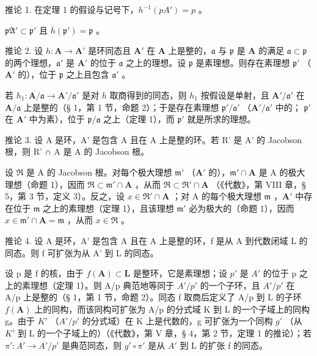 推论 1. 在定理 1 的假设与记号下，\(h^{-1}(pA') = p\) 。

\(\mathfrak{pA}' \subset \mathfrak{p}'\) 且 \(\overline{h}(\mathfrak{p}') = \mathfrak{p}\) 。

推论 2. 设 \(h: \mathbf{A} \to \mathbf{A}'\) 是环同态且 \(\mathbf{A}'\) 在 \(\mathbf{A}\) 上是整的，\(\mathfrak{a}\) 与 \(\mathfrak{p}\) 是 \(\mathbf{A}\) 的满足 \(\mathfrak{a} \subset \mathfrak{p}\) 的两个理想，\(\mathfrak{a}'\) 是 \(\mathbf{A}'\) 的位于 \(\mathfrak{a}\) 之上的理想。设 \(\mathfrak{p}\) 是素理想。则存在素理想 \(\mathfrak{p}'\) （\(\mathbf{A}'\) 的），位于 \(\mathfrak{p}\) 之上且包含 \(\mathfrak{a}'\) 。

若 \(h_1 \colon \mathbf{A} / \mathfrak{a} \to \mathbf{A}' / \mathfrak{a}'\) 是对 \(h\) 取商得到的同态，则 \(h_1\) 按假设是单射，且 \(\mathbf{A}' / \mathfrak{a}'\) 在 \(\mathbf{A} / \mathfrak{a}\) 上是整的（§ 1，第 1 节，命题 2）；于是存在素理想 \(\mathfrak{p}' / \mathfrak{a}'\) （\(\mathbf{A}' / \mathfrak{a}'\) 中的； \(\mathfrak{p}'\) 在 \(\mathbf{A}'\) 中为素），位于 \(\mathfrak{p} / \mathfrak{a}\) 之上（定理 1），而 \(\mathfrak{p}'\) 就是所求的理想。

推论 3. 设 A 是环，A' 是包含 A 且在 A 上是整的环。若 R' 是 A' 的 Jacobson 根，则 R' ∩ A 是 A 的 Jacobson 根。

设 \(\mathfrak{R}\) 是 A 的 Jacobson 根。对每个极大理想 \(\mathfrak{m}'\) （\(\mathbf{A}'\) 的），\(\mathfrak{m}' \cap \mathbf{A}\) 是 A 的极大理想（命题 1），因而 \(\mathfrak{R} \subset \mathfrak{m}' \cap \mathbf{A}\) ，从而 \(\mathfrak{R} \subset \mathfrak{R}' \cap \mathbf{A}\) （《代数》，第 VIII 章，§ 5，第 3 节，定义 3）。反之，设 \(x \in \mathfrak{R}' \cap \mathbf{A}\) ；对 A 的每个极大理想 \(\mathfrak{m}\) ，\(\mathbf{A}'\) 中存在位于 \(\mathfrak{m}\) 之上的素理想（定理 1），且该理想 \(\mathfrak{m}'\) 必为极大的（命题 1），因而 \(x \in \mathfrak{m}' \cap \mathbf{A} = \mathfrak{m}\) ，从而 \(x \in \mathfrak{R}\) 。

推论 4. 设 A 是环，A' 是包含 A 且在 A 上是整的环，f 是从 A 到代数闭域 L 的同态。则 f 可扩张为从 A' 到 L 的同态。

设 p 是 f 的核，由于 \(f(\mathbf{A}) \subset \mathbf{L}\) 是整环，它是素理想；设 \(p'\) 是 \(A'\) 的位于 p 之上的素理想（定理 1）。则 A/p 典范地等同于 \(A'/p'\) 的一个子环，且 \(A'/p'\) 在 A/p 上是整的（§ 1，第 1 节，命题 2）。同态 f 取商后定义了 A/p 到 L 的子环 \(f(\mathbf{A})\) 上的同构，而该同构可扩张为 A/p 的分式域 K 到 L 的一个子域上的同构 g。由于 \(K'\) （\(A'/p'\) 的分式域）在 K 上是代数的，g 可扩张为一个同构 \(g'\) （从 \(K'\) 到 L 的一个子域上的）（《代数》，第 V 章，§ 4，第 2 节，定理 1 的推论）；若 \(\pi': A' \to A'/p'\) 是典范同态，则 \(g' \circ \pi'\) 是从 \(A'\) 到 L 的扩张 f 的同态。

